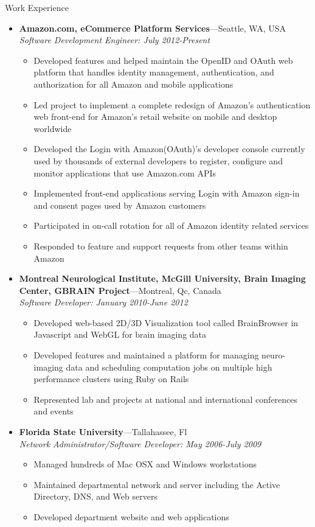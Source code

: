 \documentclass[11pt,oneside]{article}
\newenvironment{ressection}[1]{
  \vspace{4pt}
	 {\fontfamily{phv}\selectfont\Large#1}
	 \begin{itemize}
	   \vspace{3pt}
}{
	 \end{itemize}
}
\newcommand{\ressubitem}[1]{
  \vspace{-1pt}
\item \begin{flushleft} #1 \end{flushleft}
}
\newcommand{\resbigitem}[3]{
  \vspace{-5pt}
\item
  \textbf{#1}---#2 \\
  \textit{#3}
}
\newenvironment{ressubsec}[3]{
  \resbigitem{#1}{#2}{#3}
  \vspace{-2pt}
  \begin{itemize}
}{
  \end{itemize}
}
\begin{document}
\begin{ressection}{Work Experience}
  \begin{ressubsec}{Amazon.com, eCommerce Platform Services}{Seattle, WA, USA}{Software Development Engineer: July 2012-Present}  
    \ressubitem {Developed features and helped  maintain the OpenID and OAuth web platform that handles identity management, authentication, and authorization for all Amazon and mobile applications}
    \ressubitem {Led project to implement a complete redesign of Amazon's authentication web front-end for Amazon's retail website on mobile and desktop worldwide}
    \ressubitem {Developed the Login with Amazon(OAuth)'s developer console currently used by thousands of external developers to register, configure and monitor applications that use Amazon.com APIs}
    \ressubitem {Implemented front-end applications serving Login with Amazon sign-in and consent pages used by Amazon customers}
    \ressubitem {Participated in on-call rotation for all of Amazon identity related services}
    \ressubitem {Responded to feature and support requests from other teams within Amazon}
  \end{ressubsec}
  \begin{ressubsec}{Montreal Neurological Institute, McGill University, Brain Imaging Center, GBRAIN Project}{Montreal, Qc, Canada}{Software Developer: January 2010-June 2012}
    \ressubitem {Developed web-based 2D/3D Visualization tool called BrainBrowser in Javascript and WebGL for brain imaging data}
    \ressubitem {Developed features and maintained a platform for managing neuro-imaging data and scheduling computation jobs on multiple high performance clusters using Ruby on Rails}
    \ressubitem {Represented lab and projects at national and international conferences and events}
  \end{ressubsec}
  \begin{ressubsec}{Florida State University}{Tallahassee, Fl}{Network Administrator/Software Developer: May 2006-July 2009}
    \ressubitem{Managed hundreds of Mac OSX and Windows workstations}
    \ressubitem{Maintained departmental network and server including the Active Directory, DNS, and Web servers}
    \ressubitem{Developed department website and web applications}
  \end{ressubsec}
\end{ressection}
\end{document}
